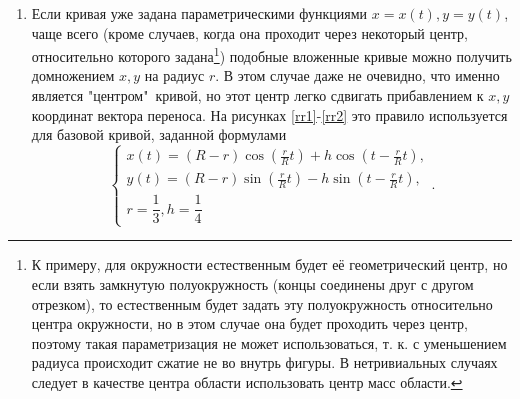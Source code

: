 \documentclass[a4paper]{article}
\begin{document}
\begin{enumerate}
  \item Если кривая уже задана параметрическими функциями $x=x(t),y=y(t)$,
  чаще всего (кроме случаев, когда она проходит через некоторый центр,
  относительно которого задана\footnote{К примеру, для окружности естественным будет её геометрический центр, но если взять замкнутую полуокружность (концы соединены друг с другом отрезком), то естественным будет задать эту полуокружность относительно центра окружности, но в этом случае она будет проходить через центр, поэтому такая параметризация не может использоваться, т. к. с уменьшением радиуса происходит сжатие не во внутрь фигуры. В нетривиальных случаях следует в качестве центра области использовать центр масс области.}) подобные вложенные кривые можно получить домножением $x,y$ на радиус $r$.
  В этом случае даже не очевидно, что именно является "центром"\ кривой, но этот центр легко сдвигать прибавлением к $x,y$ координат вектора переноса.
  На рисунках \ref{rr1}-\ref{rr2} это правило используется для базовой кривой, заданной формулами
\[
\begin{cases}
  x(t)=(R-r)\cos\left(\frac{r}{R}t\right)+h \cos \left(t-\frac{r}{R}t\right),\\
  y(t)=(R-r)\sin\left(\frac{r}{R}t\right)-h \sin \left(t-\frac{r}{R}t\right),\\
  r=\dfrac{1}{3}, h=\dfrac{1}{4}
\end{cases}.  
\]


\end{enumerate}
\end{document}
